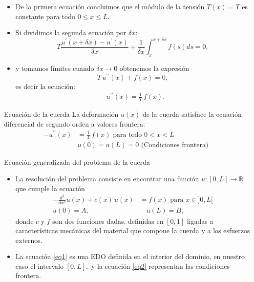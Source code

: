 \documentclass[10pt,handout]{beamer}
\theoremstyle{plain} %
\theoremstyle{plain} %
\theoremstyle{plain} %
\theoremstyle{plain} %
\theoremstyle{definition}
\theoremstyle{example}
\theoremstyle{example}
\theoremstyle{remark}
\theoremstyle{remark}
\begin{document}
\begin{frame}
\begin{itemize}
\item De la primera ecuación concluimos que el módulo de la tensión $T(x) = T$ es constante para todo $0 \le x \le L.$
\item Si dividimos la segunda ecuación por $\delta x:$
$$
T \frac{u^{\prime}(x+\delta x) -u^{\prime}(x)}{\delta x} + \frac{1}{\delta x} \int_x^{x+\delta x} f(s)ds = 0,
$$
\item y tomamos límites cuando $\delta x \rightarrow 0$ obtenemos la expresión
$$
T \,u^{\prime \prime}(x) + f(x) = 0, 
$$
es decir la ecuación:
\begin{align}
- u^{\prime \prime}(x) = \frac{1}{T} \, f(x).
\end{align}
\end{itemize}
\end{frame}

\begin{frame}
\begin{block}{Ecuación de la cuerda}
La deformación $u(x)$ de la cuerda satisface la ecuación
diferencial de segundo orden a valores frontera:
\begin{align}
- u^{\prime \prime}(x) & = \frac{1}{T} \, f(x) \text{ para todo } 0 < x < L \\ 
& u(0) = u(L) = 0 \text{ (Condiciones frontera) }
\end{align}
\end{block}
\end{frame}

\begin{frame}
\begin{block}{Ecuación generalizada del problema de la cuerda}
\begin{itemize}
\item La resolución del problema consiste en encontrar una función $u:[0,L] \longrightarrow \mathbb{R}$ que
cumple la ecuación
\begin{align}
- \frac{d^2}{dx^2}u(x) + c(x)\,u(x) & = f(x) \text{ para } x \in ]0,L[ \label{eq1} \\
u(0)=A, & \quad u(L)=B, \label{eq2}
\end{align}
donde $c$ y $f$ son dos funciones dadas, definidas en $[0,1]$ ligadas a características mecánicas del material que compone la cuerda y a los esfuerzos externos.
\item La ecuación \eqref{eq1} es una EDO definida en el interior del dominio, en nuestro caso el intervalo $[0,L],$ y la ecuación \eqref{eq2} representan las condiciones frontera.
\end{itemize}
\end{block}
\end{frame}
\end{document}
